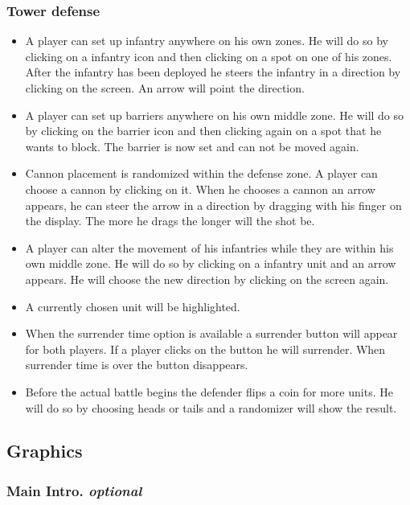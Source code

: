 \documentclass[12pt,a4paper]{article}
\begin{document}
\subsubsection{Tower defense}
\begin{itemize}
\item A player can set up infantry anywhere on his own zones. He will
  do so by clicking on a infantry icon and then clicking on a spot on
  one of his zones. After the infantry has been deployed he steers the
  infantry in a direction by clicking on the screen. An arrow will
  point the direction.
\item A player can set up barriers anywhere on his own middle zone. He
  will do so by clicking on the barrier icon and then clicking again
  on a spot that he wants to block. The barrier is now set and can not
  be moved again.
\item Cannon placement is randomized within the defense zone. A player
  can choose a cannon by clicking on it. When he chooses a cannon an
  arrow appears, he can steer the arrow in a direction by dragging
  with his finger on the display. The more he drags the longer will
  the shot be.
\item A player can alter the movement of his infantries while they are
  within his own middle zone. He will do so by clicking on a infantry
  unit and an arrow appears. He will choose the new direction by
  clicking on the screen again.
\item A currently chosen unit will be highlighted.
\item When the surrender time option is available a surrender button
  will appear for both players. If a player clicks on the button he
  will surrender. When surrender time is over the button disappears.
\item Before the actual battle begins the defender flips a coin for
  more units. He will do so by choosing heads or tails and a
  randomizer will show the result.
\end{itemize}

\subsection{Graphics}

\subsubsection{Main Intro. \emph{optional}}
\end{document}
